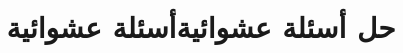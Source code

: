 \documentclass[12pt]{article}
\title{حل أسئلة عشوائية}
\title{أسئلة عشوائية}
\begin{document}
\maketitle
\renewcommand{\contentsname}{جدول المحتويات}
\tableofcontents
\clearpage




\end{document}
